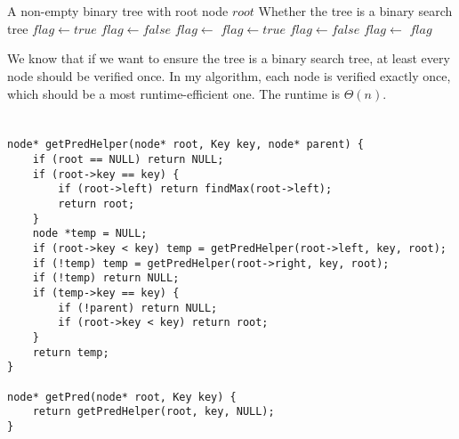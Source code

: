 \documentclass{article}
\begin{document}
\section{}
\begin{algorithm}[H]
    \begin{algorithmic}
        \Require A non-empty binary tree with root node $root$
        \Ensure Whether the tree is a binary search tree
                \State $flag\gets true$
                \State $flag\gets false$
            \Else
                \State $flag\gets$ 
            \EndIf
                \State {}
            \EndIf
                \State $flag\gets true$
                \State $flag\gets false$
            \Else
                \State $flag\gets$ 
            \EndIf
            \State \Return $flag$
        \EndFunction
    \end{algorithmic}  
\end{algorithm}

We know that if we want to ensure the tree is a binary search tree, at least every node should be verified once. In my algorithm, each node is verified exactly once, which should be a most runtime-efficient one. The runtime is $\Theta(n)$.

\section{}
\begin{verbatim}
node* getPredHelper(node* root, Key key, node* parent) {
    if (root == NULL) return NULL;
    if (root->key == key) {
        if (root->left) return findMax(root->left);
        return root;
    }
    node *temp = NULL;
    if (root->key < key) temp = getPredHelper(root->left, key, root);
    if (!temp) temp = getPredHelper(root->right, key, root);
    if (!temp) return NULL;
    if (temp->key == key) {
        if (!parent) return NULL;
        if (root->key < key) return root;
    }
    return temp;
}

node* getPred(node* root, Key key) {
    return getPredHelper(root, key, NULL);
}
\end{verbatim}
\end{document}
